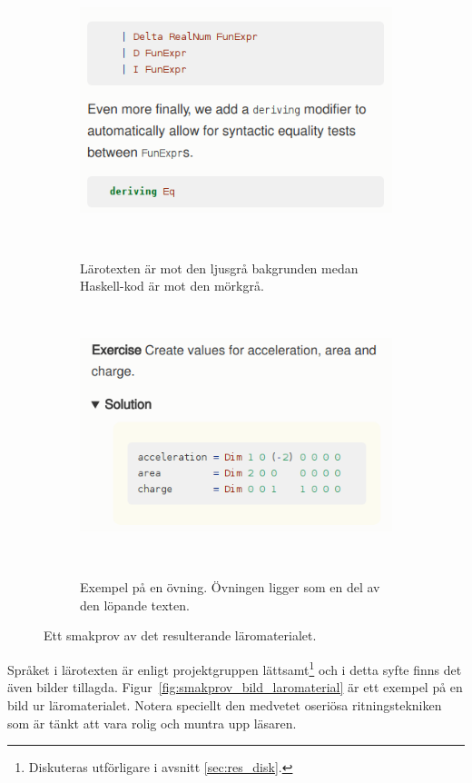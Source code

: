 \begin{figure}[h]
    \centering
    \begin{subfigure}[t]{0.5\textwidth}
        \centering
        \includegraphics[width=0.9\linewidth]{figure/smakprov_laromaterial.png}
        \caption{Lärotexten är mot den ljusgrå bakgrunden medan Haskell-kod är mot den mörkgrå.}~\label{fig:smakprov_laromaterial}
    \end{subfigure}%
    ~~~
    \begin{subfigure}[t]{0.5\textwidth}
        \centering
        \includegraphics[width=0.9\linewidth]{figure/smakprov_ovning.png}
        \caption{Exempel på en övning. Övningen ligger som en del av den
                 löpande texten.}~\label{fig:smakprov_ovning}
    \end{subfigure}
    \caption{Ett smakprov av det resulterande läromaterialet.} 
\end{figure}

Språket i lärotexten är enligt projektgruppen lättsamt\footnote{Diskuteras
utförligare i avsnitt \ref{sec:res_disk}.} och i detta syfte finns det även
bilder tillagda. Figur~\ref{fig:smakprov_bild_laromaterial} är ett exempel på en
bild ur läromaterialet. Notera speciellt den medvetet oseriösa ritningstekniken
som är tänkt att vara rolig och muntra upp läsaren.\newline

